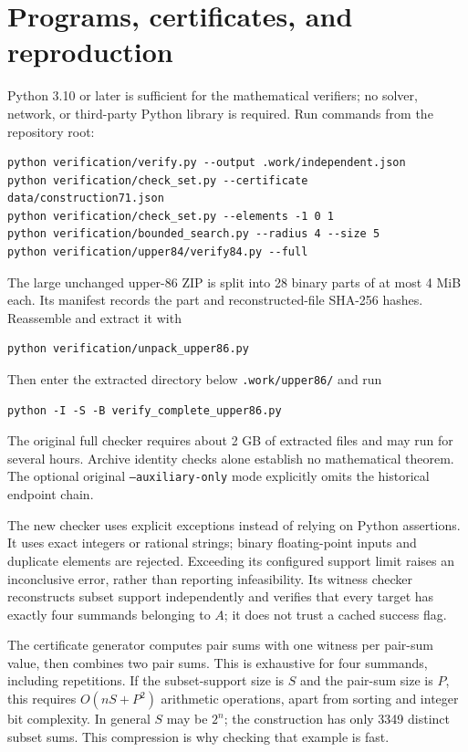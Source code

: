 \documentclass[11pt,a4paper]{article}
\theoremstyle{remark}\newtheorem{remark}[theorem]{Remark}
\begin{document}
\section{Programs, certificates, and reproduction}
Python 3.10 or later is sufficient for the mathematical verifiers; no solver, network, or third-party Python library is required. Run commands from the repository root:
\begin{verbatim}
python verification/verify.py --output .work/independent.json
python verification/check_set.py --certificate data/construction71.json
python verification/check_set.py --elements -1 0 1
python verification/bounded_search.py --radius 4 --size 5
python verification/upper84/verify84.py --full
\end{verbatim}
The large unchanged upper-86 ZIP is split into 28 binary parts of at most 4 MiB each. Its manifest records the part and reconstructed-file SHA-256 hashes. Reassemble and extract it with
\begin{verbatim}
python verification/unpack_upper86.py
\end{verbatim}
Then enter the extracted directory below \texttt{.work/upper86/} and run
\begin{verbatim}
python -I -S -B verify_complete_upper86.py
\end{verbatim}
The original full checker requires about 2 GB of extracted files and may run for several hours. Archive identity checks alone establish no mathematical theorem. The optional original \texttt{--auxiliary-only} mode explicitly omits the historical endpoint chain.

The new checker uses explicit exceptions instead of relying on Python assertions. It uses exact integers or rational strings; binary floating-point inputs and duplicate elements are rejected. Exceeding its configured support limit raises an inconclusive error, rather than reporting infeasibility. Its witness checker reconstructs subset support independently and verifies that every target has exactly four summands belonging to $A$; it does not trust a cached success flag.

The certificate generator computes pair sums with one witness per pair-sum value, then combines two pair sums. This is exhaustive for four summands, including repetitions. If the subset-support size is $S$ and the pair-sum size is $P$, this requires $O(nS+P^2)$ arithmetic operations, apart from sorting and integer bit complexity. In general $S$ may be $2^n$; the construction has only 3349 distinct subset sums. This compression is why checking that example is fast.
\end{document}
